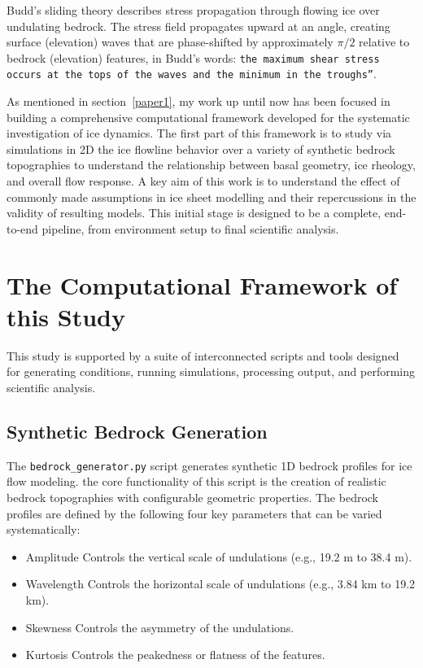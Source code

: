 Budd's sliding theory describes stress propagation through flowing ice over undulating bedrock. The stress field propagates upward at an angle, creating surface (elevation) waves that are phase-shifted by approximately $\pi/2$ relative to bedrock (elevation) features, in Budd's words: \texttt{\texttt{the maximum shear stress occurs at the tops of the waves and the minimum in the troughs''\cite{Budd_1970}}}. 

As mentioned in section~\ref{paper1}, my work up until now has been focused in building a comprehensive computational framework developed for the systematic investigation of ice dynamics. The first part of this framework is to study via simulations in 2D the ice flowline behavior over a variety of synthetic bedrock topographies to understand the relationship between basal geometry, ice rheology, and overall flow response. A key aim of this work is to understand the effect of commonly made assumptions in ice sheet modelling and their repercussions in the validity of resulting models. This initial stage is designed to be a complete, end-to-end pipeline, from environment setup to final scientific analysis. 

\section{The Computational Framework of this Study}

This study is supported by a suite of interconnected scripts and tools designed for generating conditions, running simulations, processing output, and performing scientific analysis.

\subsection{Synthetic Bedrock Generation}

The \texttt{bedrock\_generator.py} script generates synthetic 1D bedrock profiles for ice flow modeling. the core functionality of this script is the creation of realistic bedrock topographies with configurable geometric properties. The bedrock profiles are defined by the following four key parameters that can be varied systematically:
\begin{itemize}
\item{Amplitude} Controls the vertical scale of undulations (e.g., 19.2 m to 38.4 m).
\item{Wavelength} Controls the horizontal scale of undulations (e.g., 3.84 km to 19.2 km).
\item{Skewness} Controls the asymmetry of the undulations.
\item{Kurtosis} Controls the peakedness or flatness of the features.
\end{itemize}


